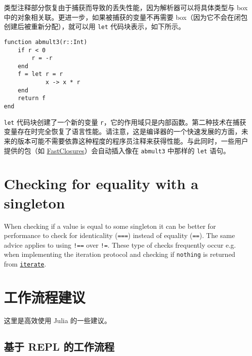 类型注释部分恢复由于捕获而导致的丢失性能，因为解析器可以将具体类型与 box 中的对象相关联。更进一步，如果被捕获的变量不再需要 box（因为它不会在闭包创建后被重新分配），就可以用 \texttt{let} 代码块表示，如下所示。




\begin{verbatim}
function abmult3(r::Int)
    if r < 0
        r = -r
    end
    f = let r = r
            x -> x * r
    end
    return f
end
\end{verbatim}



\texttt{let} 代码块创建了一个新的变量 \texttt{r}，它的作用域只是内部函数。第二种技术在捕获变量存在时完全恢复了语言性能。请注意，这是编译器的一个快速发展的方面，未来的版本可能不需要依靠这种程度的程序员注释来获得性能。与此同时，一些用户提供的包（如 \href{https://github.com/c42f/FastClosures.jl}{FastClosures}）会自动插入像在 \texttt{abmult3} 中那样的 \texttt{let} 语句。



\hypertarget{17337125735077390471}{}


\chapter{Checking for equality with a singleton}



When checking if a value is equal to some singleton it can be better for performance to check for identicality (\texttt{===}) instead of equality (\texttt{==}). The same advice applies to using \texttt{!==} over \texttt{!=}. These type of checks frequently occur e.g. when implementing the iteration protocol and checking if \texttt{nothing} is returned from \hyperlink{1722534687975587846}{\texttt{iterate}}.



\hypertarget{14117620934191882930}{}


\chapter{工作流程建议}



这里是高效使用 Julia 的一些建议。



\hypertarget{1742408234615272902}{}


\section{基于 REPL 的工作流程}



